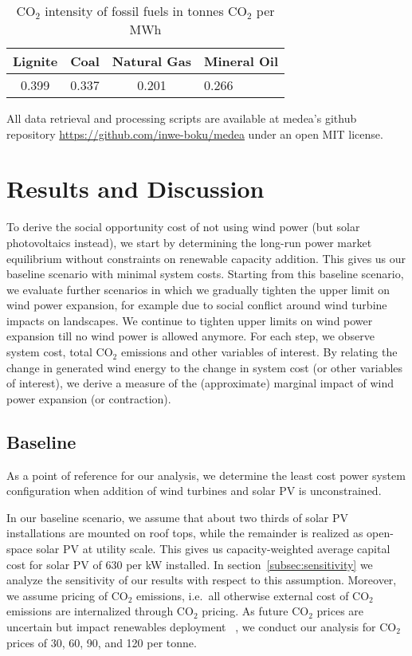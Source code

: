 \documentclass[final, 3p, times]{elsarticle} %
\newcommand{\COO}{\ensuremath{\mathrm{CO_2}} }
\begin{document}
    \begin{table}[h!]
        \centering
        \caption{\COO intensity of fossil fuels in tonnes \COO per MWh}
        \label{table:carbon-intensity}
        \begin{tabular}{c c c l}
            \toprule
            Lignite & Coal & Natural Gas & Mineral Oil   \\
            \midrule
            0.399 & 0.337 & 0.201 & 0.266         \\
            \bottomrule
        \end{tabular}
    \end{table}

    All data retrieval and processing scripts are available at medea's github repository
    \url{https://github.com/inwe-boku/medea} under an open MIT license.


    \section{Results and Discussion} \label{sec:results-discussion}
    To derive the social opportunity cost of not using wind power (but solar photovoltaics instead), we start by
    determining the long-run power market equilibrium without constraints on renewable capacity addition.
    This gives us our baseline scenario with minimal system costs.
    Starting from this baseline scenario, we evaluate further scenarios in which we gradually tighten the upper limit
    on wind power expansion, for example due to social conflict around wind turbine impacts on landscapes.
    We continue to tighten upper limits on wind power expansion till no wind power is allowed anymore.
    For each step, we observe system cost, total \COO emissions and other variables of interest.
    By relating the change in generated wind energy to the change in system cost (or other variables of interest), we
    derive a measure of the (approximate) marginal impact of wind power expansion (or contraction).

    \subsection{Baseline} \label{subsec:baseline}
    As a point of reference for our analysis, we determine the least cost power system configuration when addition of
    wind turbines and solar PV is unconstrained.

    In our baseline scenario, we assume that about two thirds of solar PV installations are mounted on roof tops, while
    the remainder is realized as open-space solar PV at utility scale.
    This gives us capacity-weighted average capital cost for solar PV of $630$ \EUR per kW installed.
    In section~\ref{subsec:sensitivity} we analyze the sensitivity of our results with respect to this assumption.
    Moreover, we assume pricing of \COO emissions, i.e.\ all otherwise external cost of \COO emissions are
    internalized through \COO pricing.
    As future \COO prices are uncertain but impact renewables deployment ~\citep{Brown2020, Kirchner2019}, we conduct
    our analysis for \COO prices of 30, 60, 90, and 120 \EUR per tonne.
\end{document}
